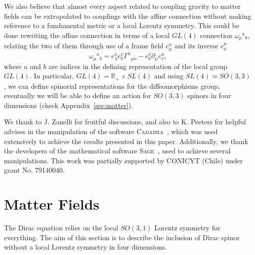 \documentclass[twocolumn,aps,
  showpacs,showkeys,prd,superscriptaddress]{revtex4-1}
\renewcommand{\(}{\left(}
\renewcommand{\)}{\right)}
\renewcommand{\[}{\left[}
\renewcommand{\]}{\right]}
\begin{document}
We also believe that almost every aspect related to coupling gravity to matter fields can be extrapolated to couplings with the affine connection without making reference to a fundamental metric or a local Lorentz symmetry. This could be  done rewriting the affine connection in terms of a local $GL(4)$ connection
$\omega_{\mu}{}^a{}_b$, relating the two of them through use of a frame field $e_\mu^a$ and its inverse $e^\mu_a$
\begin{equation}
  \omega_{\mu}{}^a{}_b = e_\lambda^a e_b^\nu \Gamma^{\lambda}{}_{\mu\nu} -  e_b^\nu\partial_{\mu}e_\nu^a,
\end{equation} where $a$ and $b$ are indices in the defining representation of the local group $GL(4)$.
 In particular, \mbox{$GL(4) = \mathbb{R}_+ \times SL(4)$} and using \mbox{$SL(4) \simeq SO(3,3)$,} we can define spinorial representations for the diffeomorphisms group, eventually we will be able to define an action for $SO(3,3)$ spinors in four dimensions (check Appendix~\ref{sec:matter}).


\begin{acknowledgments}
  We thank to J. Zanelli for fruitful discussions, and also to K. Peeters for helpful advises in the manipulation of the software \textsc{Cadabra}~\cite{Peeters:2007wn,*peeters2007symbolic,*Peeters2007550}, which was used extensively to achieve the results presented in this paper. Additionally, we thank the developers of the mathematical software \textsc{Sage}~\cite{sage}, used to achieve several manipulations. This work was partially supported by CONICYT (Chile) under grant No. 79140040.
\end{acknowledgments}


\appendix

\section{\label{sec:matter} Matter Fields}

The Dirac equation relies on the local $SO(3,1)$ Lorentz symmetry for everything. The aim of this section is to describe the inclusion of Dirac spinor without a local Lorentz symmetry in four dimensions. 
\end{document}
